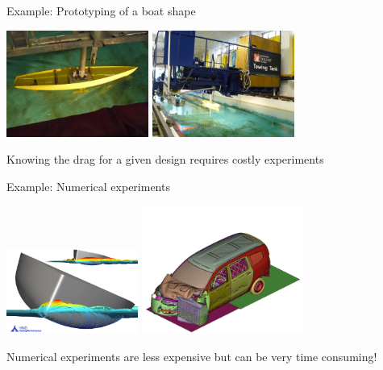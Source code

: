 \documentclass{beamer}
\begin{document}
\begin{frame}{}
\begin{exampleblock}{Example: Prototyping of a boat shape}
\begin{center}
\includegraphics[height=3.5cm]{figures/carene} \qquad \includegraphics[height=3.5cm]{figures/carene2}
\end{center}
Knowing the drag for a given design requires costly experiments
\end{exampleblock}
\end{frame}

\begin{frame}{}
\begin{exampleblock}{Example: Numerical experiments}
\begin{center}
\includegraphics[height=2.8cm]{figures/waterflow} \qquad \includegraphics[height=4.2cm]{figures/crash/image15}
\end{center}
Numerical experiments are less expensive but can be very time consuming!
\end{exampleblock}
\end{frame}
\end{document}
